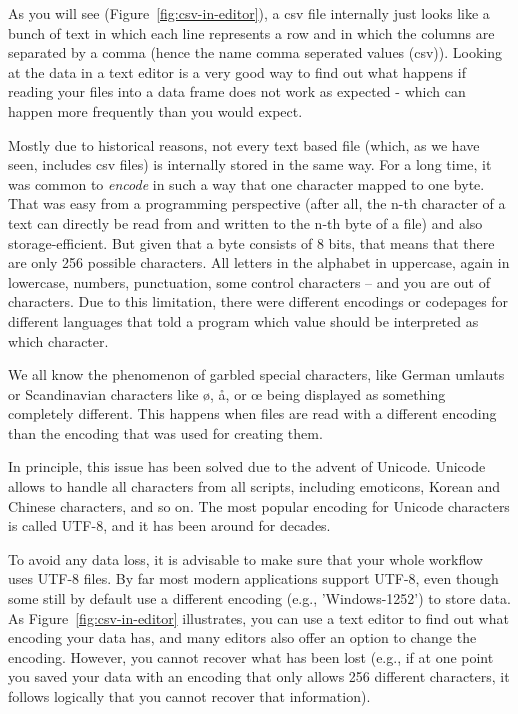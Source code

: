 As you will see (Figure~\ref{fig:csv-in-editor}), a csv file internally just looks like a bunch of text in which each line represents a row and in which the columns are separated by a comma (hence the name comma seperated values (csv)).
Looking at the data in a text editor is a very good way to find out what happens if reading your files into a data frame does not work as expected - which can happen more frequently than you would expect.

Mostly due to historical reasons, not every text based file (which, as we have seen, includes csv files) is internally stored in the same way.
For a long time, it was common to \emph{encode} in such a way that one character mapped to one byte. That was easy from a programming perspective (after all, the n-th character of a text can directly be read from and written to the n-th byte of a file) and also storage-efficient. But given that a byte consists of 8 bits, that means that there are only 256 possible characters. All letters in the alphabet in uppercase, again in lowercase, numbers, punctuation, some control characters -- and you are out of characters. Due to this limitation, there were different encodings or codepages for different languages that told a program which value should be interpreted as which character.

We all know the phenomenon of garbled special characters, like German umlauts or Scandinavian characters like ø, å, or œ being displayed as something completely different. This happens when files are read with a different encoding than the encoding that was used for creating them.

In principle, this issue has been solved due to the advent of Unicode. Unicode allows to handle all characters from all scripts, including emoticons, Korean and Chinese characters, and so on. The most popular encoding for Unicode characters is called UTF-8, and it has been around for decades. 

To avoid any data loss, it is advisable to make sure that your whole workflow uses UTF-8 files. By far most modern applications support UTF-8, even though some still by default use a different encoding (e.g., 'Windows-1252') to store data. As Figure~\ref{fig:csv-in-editor} illustrates, you can use a text editor to find out what encoding your data has, and many editors also offer an option to change the encoding. However, you cannot recover what has been lost (e.g., if at one point you saved your data with an encoding that only allows 256 different characters, it follows logically that you cannot recover that information).


